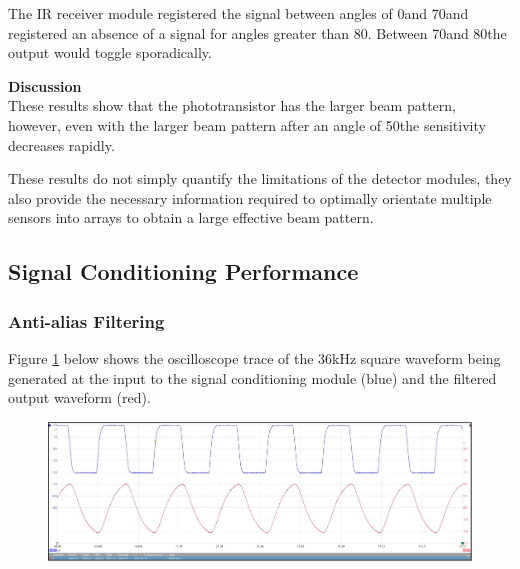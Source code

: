 The IR receiver module registered the signal between angles of 0\textdegree and 70\textdegree and registered an absence of a signal for angles greater than 80\textdegree. Between 70\textdegree and 80\textdegree the output would toggle sporadically.


\textbf{Discussion}\\
These results show that the phototransistor has the larger beam pattern, however, even with the larger beam pattern after an angle of 50\textdegree the sensitivity decreases rapidly.

These results do not simply quantify the limitations of the detector modules, they also provide the necessary information required to optimally orientate multiple sensors into arrays to obtain a large effective beam pattern.








\subsection{Signal Conditioning Performance}

\subsubsection{Anti-alias Filtering}
Figure \ref{fig:anti_alias_filtering} below shows the oscilloscope trace of the 36kHz square waveform being generated at the input to the signal conditioning module (blue) and the filtered output waveform (red).

\begin{figure}[H]
	\centering
	\includegraphics[width=\textwidth]{figures/results/low_pass_filter/36kHzsquarewavein.JPG}
	\label{fig:anti_alias_filtering}
\end{figure}

